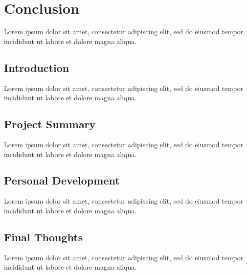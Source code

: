 \documentclass[12pt, a4paper]{article}
\begin{document}
\pagebreak


\section{Conclusion}

Lorem ipsum dolor sit amet, consectetur adipiscing elit, sed do eiusmod tempor incididunt ut labore et dolore magna aliqua.


\subsection{Introduction}

Lorem ipsum dolor sit amet, consectetur adipiscing elit, sed do eiusmod tempor incididunt ut labore et dolore magna aliqua.


\subsection{Project Summary}


Lorem ipsum dolor sit amet, consectetur adipiscing elit, sed do eiusmod tempor incididunt ut labore et dolore magna aliqua.


\subsection{Personal Development}

Lorem ipsum dolor sit amet, consectetur adipiscing elit, sed do eiusmod tempor incididunt ut labore et dolore magna aliqua.


\subsection{Final Thoughts}

Lorem ipsum dolor sit amet, consectetur adipiscing elit, sed do eiusmod tempor incididunt ut labore et dolore magna aliqua.
\end{document}
